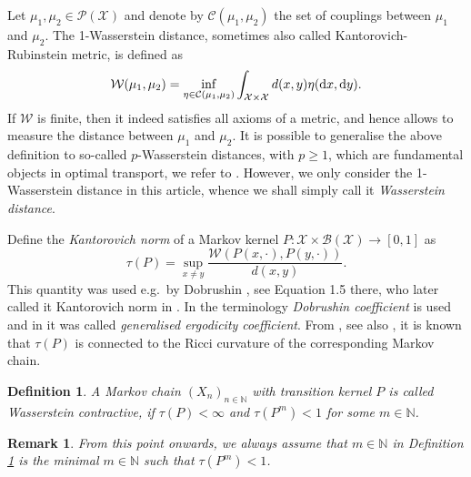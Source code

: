 \documentclass[12pt]{article}
\theoremstyle{plain}
\newtheorem{rem}[thm]{Remark}
\newtheorem{defi}[thm]{Definition}
\renewcommand{\d}{{\rm d}}
\newcommand{\N}{\mathbb{N}}
\newcommand{\cX}{\mathcal{X}}
\begin{document}
Let $\mu_1, \mu_2 \in \mathcal{P(\cX)}$ and denote by $\mathcal{C}(\mu_1, \mu_2)$ the set of couplings between $\mu_1$ and $\mu_2$. The 1-Wasserstein distance, sometimes also called Kantorovich-Rubinstein metric, is defined as 
\[
\mathcal{W}(\mu_1, \mu_2) = \inf_{\eta \in \mathcal{C}(\mu_1, \mu_2)} \int_{\cX \times \cX} d(x,y) \eta(\d x , \d y).
\]
If $\mathcal{W}$ is finite, then it indeed satisfies all axioms of a metric, and hence allows to measure the distance between $\mu_1$ and $\mu_2$. It is possible to generalise the above definition to so-called $p$-Wasserstein distances, with $p \geq 1$, which are fundamental objects in optimal transport, we refer to \cite{villani2009optimal}.
However, we only consider the 1-Wasserstein distance in this article, whence we shall simply call it \textit{Wasserstein distance}.

Define the \textit{Kantorovich norm} of a Markov kernel $P \colon \cX \times \mathcal{B}(\cX) \to [0,1]$ as 
\[
\tau(P) = \sup_{x \neq y} \frac{\mathcal{W}(P(x, \cdot ), P(y,\cdot ))}{d(x,y)}.
\]
This quantity was used e.g.~by Dobrushin \cite{dobrushin1956central}, see Equation 1.5 there, who later called it Kantorovich norm in \cite{dobrushin96}.
In \cite{douc2018markov} the terminology \textit{Dobrushin coefficient} is used and in \cite{rudolf2018pertubation} it was called \textit{generalised ergodicity coefficient}.
From \cite{ollivier2009ricci}, see also \cite{Joulin2010Curvature,paulin2016mixing}, it is known that $\tau(P)$ is connected to the Ricci curvature of the corresponding Markov chain.


\begin{defi}\label{def:contractive_chain}
A Markov chain $(X_n)_{n \in \N}$ with transition kernel $P$ is called \textit{Wasserstein contractive}, if $\tau(P)<\infty$ and $\tau(P^m)<1$ for some $m \in \N$. 
\end{defi}

\begin{rem}
From this point onwards, we always assume that $m \in \N$ in Definition \ref{def:contractive_chain} is the minimal $m \in \N$ such that $\tau(P^m)<1$.
\end{rem}
\end{document}

